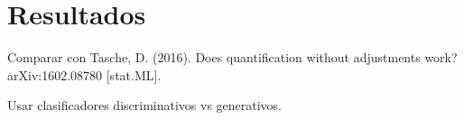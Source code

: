 \chapter{Resultados}\label{resultados}

Comparar con Tasche, D. (2016). Does quantification without adjustments work?
arXiv:1602.08780 [stat.ML].

Usar clasificadores discriminativos vs generativos.